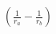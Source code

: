 \documentclass[preview]{standalone}
\begin{document}
\begin{align*}
\left( \frac{1}{r_a} - \frac{1}{r_b} \right)
\end{align*}
\end{document}
